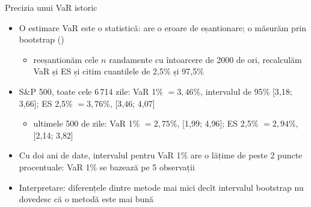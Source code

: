 \begin{frame}{Precizia unui VaR istoric}
\itemsize{\footnotesize}
\begin{itemize}
    \item O estimare VaR este o statistică: are o eroare de eșantionare; o măsurăm prin bootstrap ()
    \begin{itemize}
        \item reeșantionăm cele $n$ randamente cu întoarcere de 2000 de ori, recalculăm VaR și ES și citim cuantilele de 2,5\% și 97,5\%
    \end{itemize}
    \item S\&P 500, toate cele 6\,714 zile: VaR 1\% $= 3{,}46\%$, intervalul de 95\% [3{,}18; 3{,}66]; ES 2,5\% $= 3{,}76\%$, [3{,}46; 4{,}07]
    \begin{itemize}
        \item ultimele 500 de zile: VaR 1\% $= 2{,}75\%$, [1{,}99; 4{,}96]; ES 2,5\% $= 2{,}94\%$, [2{,}14; 3{,}82]
    \end{itemize}
    \item Cu doi ani de date, intervalul pentru VaR 1\% are o lățime de peste 2 puncte procentuale: VaR 1\% se bazează pe 5 observații
    \item Interpretare: diferențele dintre metode mai mici decît intervalul bootstrap nu dovedesc că o metodă este mai bună
\end{itemize}
\end{frame}

